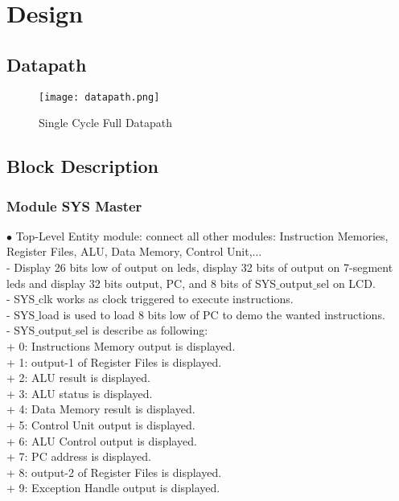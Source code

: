 \documentclass[12pt, a4paper, oneside]{article}
\begin{document}
    \section{Design}
    \subsection{Datapath} 
    \begin{figure}[H]
    	\texttt{[image: datapath.png]}
    	\caption{Single Cycle Full Datapath}
    	\label{fig:1}
    \end{figure}
    \subsection{Block Description}
    \subsubsection{Module SYS Master}
    $\bullet$ Top-Level Entity module: connect all other modules: Instruction Memories, Register Files, ALU, Data Memory, Control Unit,...\\
    \indent \indent- Display 26 bits low of output on leds, display 32 bits of output on 7-segment leds and display 32 bits output, PC, and 8 bits of SYS$\_$output$\_$sel on LCD.\\
    \indent \indent- SYS$\_$clk works as clock triggered to execute instructions.\\
    \indent \indent- SYS$\_$load is used to load 8 bits low of PC to demo the wanted instructions.\\
    \indent \indent- SYS$\_$output$\_$sel is describe as following:\\
    \indent \indent \indent \indent+ 0: Instructions Memory output is displayed.\\
    \indent \indent \indent \indent+ 1: output-1 of Register Files is displayed.\\
    \indent \indent \indent \indent+ 2: ALU result is displayed.\\
    \indent \indent \indent \indent+ 3: ALU status is displayed.\\
    \indent \indent \indent \indent+ 4: Data Memory result is displayed.\\
    \indent \indent \indent \indent+ 5: Control Unit output is displayed.\\    
    \indent \indent \indent \indent+ 6: ALU Control output is displayed.\\
    \indent \indent \indent \indent+ 7: PC address is displayed.\\
    \indent \indent \indent \indent+ 8: output-2 of Register Files is displayed.\\
    \indent \indent \indent \indent+ 9: Exception Handle output is displayed.
    
\end{document}
